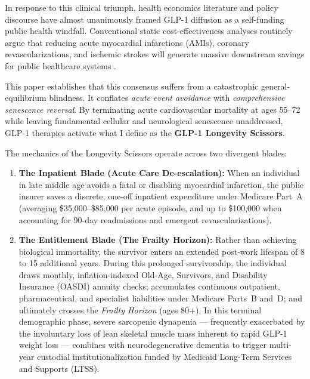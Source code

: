 \documentclass[11pt,a4paper]{article}
\begin{document}
In response to this clinical triumph, health economics literature and policy discourse have almost unanimously framed GLP-1 diffusion as a self-funding public health windfall. Conventional static cost-effectiveness analyses routinely argue that reducing acute myocardial infarctions (AMIs), coronary revascularizations, and ischemic strokes will generate massive downstream savings for public healthcare systems \citep{cutler2006value,murphy2006value}.

This paper establishes that this consensus suffers from a catastrophic general-equilibrium blindness. It conflates \textit{acute event avoidance} with \textit{comprehensive senescence reversal}. By terminating acute cardiovascular mortality at ages 55--72 while leaving fundamental cellular and neurological senescence unaddressed, GLP-1 therapies activate what I define as the \textbf{GLP-1 Longevity Scissors}.

The mechanics of the Longevity Scissors operate across two divergent blades:
\begin{enumerate}
    \item \textbf{The Inpatient Blade (Acute Care De-escalation):} When an individual in late middle age avoids a fatal or disabling myocardial infarction, the public insurer saves a discrete, one-off inpatient expenditure under Medicare Part~A (averaging \$35,000--\$85,000 per acute episode, and up to \$100,000 when accounting for 90-day readmissions and emergent revascularizations).
    \item \textbf{The Entitlement Blade (The Frailty Horizon):} Rather than achieving biological immortality, the survivor enters an extended post-work lifespan of 8 to 15 additional years. During this prolonged survivorship, the individual draws monthly, inflation-indexed Old-Age, Survivors, and Disability Insurance (OASDI) annuity checks; accumulates continuous outpatient, pharmaceutical, and specialist liabilities under Medicare Parts~B and~D; and ultimately crosses the \textit{Frailty Horizon} (ages 80+). In this terminal demographic phase, severe sarcopenic dynapenia --- frequently exacerbated by the involuntary loss of lean skeletal muscle mass inherent to rapid GLP-1 weight loss \citep{batsis2018sarcopenic,sargeant2024body} --- combines with neurodegenerative dementia \citep{alzheimer2024facts} to trigger multi-year custodial institutionalization funded by Medicaid Long-Term Services and Supports (LTSS).
\end{enumerate}
\end{document}
